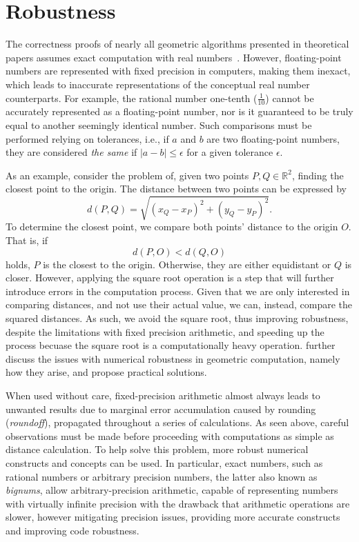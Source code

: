 \section{Robustness}%
\label{sec:related.robustness}

The correctness proofs of nearly all geometric algorithms presented in
theoretical papers assumes exact computation with real
numbers~\cite{cgal:bfghhkps-lgk23-18b}.  However, floating-point numbers are
represented with fixed precision in computers, making them inexact, which leads
to inaccurate representations of the conceptual real number counterparts.  For
example, the rational number one-tenth ($\frac{1}{10}$) cannot be accurately
represented as a floating-point number, nor is it guaranteed to be truly equal
to another seemingly identical number.  Such comparisons must be performed
relying on tolerances, i.e., if $a$ and $b$ are two floating-point numbers, they
are considered \textit{the same} if $|a - b| \le \epsilon$ for a given tolerance
$\epsilon$.

As an example, consider the problem of, given two points $P,Q \in \mathbb{R}^2$,
finding the closest point to the origin.  The distance between two points can be
expressed by
%
\begin{equation}
  d(P, Q) = \sqrt{(x_Q - x_P)^2 + (y_Q - y_P)^2}.
\end{equation}
%
To determine the closest point, we compare both points' distance to the origin
$O$.  That is, if
%
\[
  d(P, O) < d(Q, O)
\]
%
holds, $P$ is the closest to the origin.  Otherwise, they are either equidistant
or $Q$ is closer.  However, applying the square root operation is a step that
will further introduce errors in the computation process.  Given that we are
only interested in comparing distances, and not use their actual value, we can,
instead, compare the squared distances.  As such, we avoid the square root, thus
improving robustness, despite the limitations with fixed precision arithmetic,
and speeding up the process becuase the square root is a computationally heavy
operation.   further discuss the issues with numerical
robustness in geometric computation, namely how they arise, and propose
practical solutions.

When used without care, fixed-precision arithmetic almost always leads to
unwanted results due to marginal error accumulation caused by rounding
(\textit{roundoff}), propagated throughout a series of calculations.  As seen
above, careful observations must be made before proceeding with computations as
simple as distance calculation.  To help solve this problem, more robust
numerical constructs and concepts can be used.  In particular, exact numbers,
such as rational numbers or arbitrary precision numbers, the latter also known
as \textit{bignums}, allow arbitrary-precision arithmetic, capable of
representing numbers with virtually infinite precision with the drawback that
arithmetic operations are slower, however mitigating precision issues, providing
more accurate constructs and improving code robustness.

